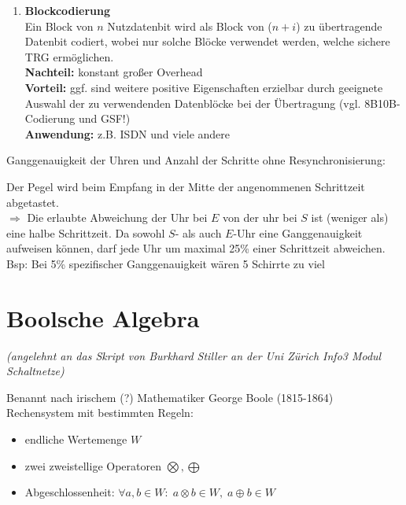 \documentclass[10pt,a4paper]{scrartcl}
\begin{document}
\begin{enumerate}
	\item \textbf{Blockcodierung}\\
	Ein Block von $n$ Nutzdatenbit wird als Block von ($n+i$) zu übertragende Datenbit codiert, wobei nur solche Blöcke verwendet werden, welche sichere \ac{TRG} ermöglichen.\\
	\textbf{Nachteil:} konstant großer Overhead\\
	\textbf{Vorteil:} ggf. sind weitere positive Eigenschaften erzielbar durch geeignete Auswahl der zu verwendenden Datenblöcke bei der Übertragung (vgl. 8B10B-Codierung und \ac{GSF}!)\\
	\textbf{Anwendung:} z.B. ISDN und viele andere
\end{enumerate}

Ganggenauigkeit der Uhren und Anzahl der Schritte ohne Resynchronisierung:
\begin{center}
\end{center}
Der Pegel wird beim Empfang in der Mitte der angenommenen Schrittzeit abgetastet.\\
$\Rightarrow$ Die erlaubte Abweichung der Uhr bei $E$ von der uhr bei $S$ ist (weniger als) eine halbe Schrittzeit. Da sowohl $S$- als auch $E$-Uhr eine Ganggenauigkeit aufweisen können, darf jede Uhr um maximal 25\% einer Schrittzeit abweichen.\\
Bsp: Bei 5\% spezifischer Ganggenauigkeit wären 5 Schirrte \glqq zu viel\grqq

\section{Boolsche Algebra}
\begin{center}
	\textit{(angelehnt an das Skript von Burkhard Stiller an der Uni Zürich \glqq Info3 Modul Schaltnetze\grqq)
}
\end{center}
Benannt nach irischem (?) Mathematiker George Boole (1815-1864)\\
Rechensystem mit bestimmten Regeln:
\begin{itemize}
\item endliche Wertemenge $W$
\item zwei zweistellige Operatoren $\bigotimes, \bigoplus$
\item Abgeschlossenheit: $\forall a, b \in W\!: \; a \otimes  b \in W, \; a \oplus b \in W$
\end{itemize}
\end{document}

